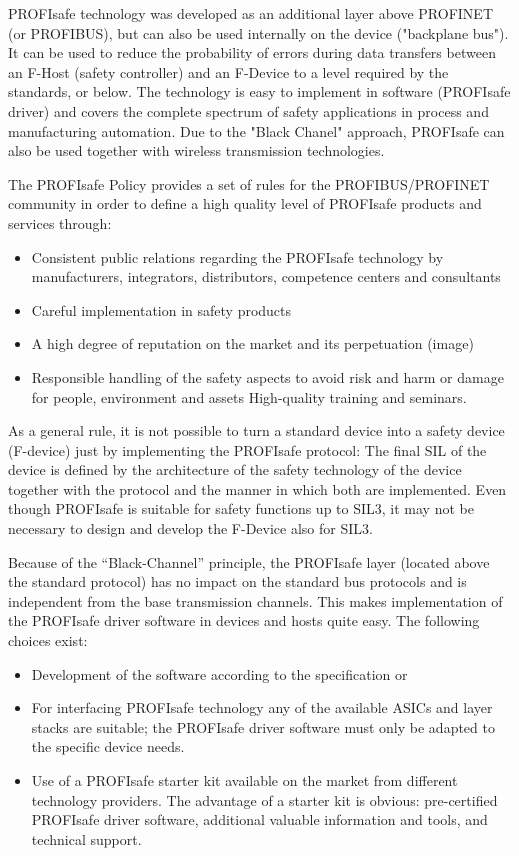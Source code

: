 \documentclass[conference]{IEEEtran}
\begin{document}
PROFIsafe technology was developed as an additional layer above PROFINET (or PROFIBUS), but can also be used internally on the device ("backplane bus"). It can be used to reduce the probability of errors during data transfers between an F-Host (safety controller) and an F-Device to a level required by the standards, or below. The technology is easy to implement in software (PROFIsafe driver) and covers the complete spectrum of safety applications in process and manufacturing automation. Due to the "Black Chanel" approach, PROFIsafe can also be used together with wireless transmission technologies. 

The PROFIsafe Policy provides a set of rules for the PROFIBUS/PROFINET community in order to define a high quality level of PROFIsafe products and services through:
 
 \begin{itemize}
     \item Consistent public relations regarding the PROFIsafe technology by manufacturers, integrators, distributors, competence centers and consultants
     \item Careful implementation in safety products
     \item A high degree of reputation on the market and its perpetuation (image)
     \item Responsible handling of the safety aspects to avoid risk and harm or damage for people, environment and assets
High-quality training and seminars.
     \end{itemize}

As a general rule, it is not possible to turn a standard device into a safety device (F-device) just by implementing the PROFIsafe protocol: The final SIL of the device is defined by the architecture of the safety technology of the device together with the protocol and the manner in which both are implemented. Even though PROFIsafe is suitable for safety functions up to SIL3, it may not be necessary to design and develop the F-Device also for SIL3. 

Because of the “Black-Channel” principle, the PROFIsafe layer (located above the standard protocol) has no impact on the standard bus protocols and is independent from the base transmission channels. This makes implementation of the PROFIsafe driver software in devices and hosts quite easy. The following choices exist:

\begin{itemize}
    \item Development of the software according to the specification or
    \item For interfacing PROFIsafe technology any of the available ASICs and layer stacks are suitable; the PROFIsafe driver software must only be adapted to the specific device needs.
    \item Use of a PROFIsafe starter kit available on the market from different technology providers. The advantage of a starter kit is obvious: pre-certified PROFIsafe driver software, additional valuable information and tools, and technical support.
\end{itemize}
\end{document}
